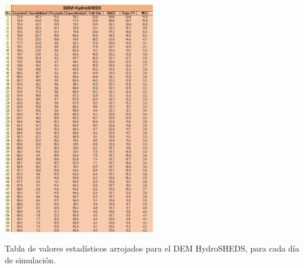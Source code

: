 \documentclass[10pt,a4paper, twoside]{report}
\begin{document}
\begin{table}[H]
   \centering      
   \includegraphics[width=0.5\textwidth]{imagenes/DEMHSHEDS2.jpg}
 \caption{Tabla de valores estadísticos arrojados para el DEM HydroSHEDS, para cada día de simulación.}
 \label{DEMHSHEDS}
\end{table}
\end{document}
